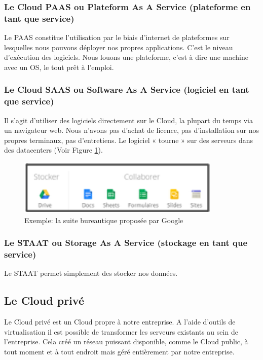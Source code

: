     \subsubsection{Le Cloud PAAS ou Plateform As A Service (plateforme en tant que service)}
    Le PAAS constitue l’utilisation par le biais d’internet de plateformes sur lesquelles nous pouvons déployer nos propres applications. C’est le niveau d’exécution des logiciels. Nous louons une plateforme, c’est à dire une machine avec un OS, le tout prêt à l’emploi.

    \subsubsection{Le Cloud SAAS ou Software As A Service (logiciel en tant que service)}
    Il s’agit d’utiliser des logiciels directement sur le Cloud, la plupart du temps via un navigateur web. Nous n’avons pas d’achat de licence, pas d’installation sur nos propres terminaux, pas d’entretiens. Le logiciel « tourne » sur des serveurs dans des datacenters (Voir Figure \ref{Google Cloud}).

    \begin{figure}
      \begin{center}
        \includegraphics[scale=1]{images/googleDrive.png}
      \end{center}
      \caption{Exemple: la suite bureautique proposée par Google}
      \label{Google Cloud}
    \end{figure}

    \subsubsection{Le STAAT ou Storage As A Service (stockage en tant que service)}
    Le STAAT permet simplement des stocker nos données.

  \subsection{Le Cloud privé}
  Le Cloud privé est un Cloud propre à notre entreprise. A l’aide d’outils de virtualisation il est possible de transformer les serveurs existants au sein de l’entreprise. Cela créé un réseau puissant disponible, comme le Cloud public, à tout moment et à tout endroit mais géré entièrement par notre entreprise.

